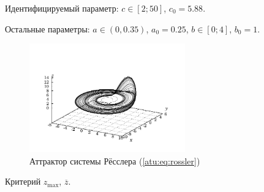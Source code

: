Идентифицируемый параметр:
$ c \in [2; 50] $, $c_0=5.88$.

Остальные параметры:
\( a \in (0, 0.35 ) \), $a_0=0.25$,
\(b \in[0;4] \), $b_0=1$.

\begin{figure}[htb!]
\centerline{\includegraphics[width=0.6\textwidth]{p/cha/ross_phase3.pdf} }
\caption{Аттрактор системы Рёсслера (\ref{atu:eq:rossler})}
\label{atu:f:ross_phase}
\end{figure}

Критерий
$ z_{\max}$, $ \overline{z} $.


